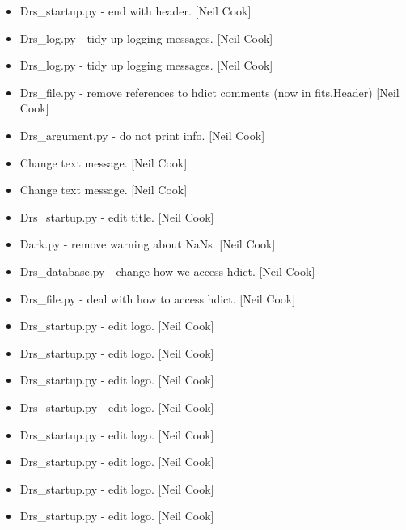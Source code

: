 \documentclass[a4paper,10pt,english]{report}
\begin{document}
\begin{itemize}
\item {} 
Drs\_startup.py - end with header. {[}Neil Cook{]}

\item {} 
Drs\_log.py - tidy up logging messages. {[}Neil Cook{]}

\item {} 
Drs\_log.py - tidy up logging messages. {[}Neil Cook{]}

\item {} 
Drs\_file.py - remove references to hdict comments (now in fits.Header)
{[}Neil Cook{]}

\item {} 
Drs\_argument.py - do not print info. {[}Neil Cook{]}

\item {} 
Change text message. {[}Neil Cook{]}

\item {} 
Change text message. {[}Neil Cook{]}

\item {} 
Drs\_startup.py - edit title. {[}Neil Cook{]}

\item {} 
Dark.py - remove warning about NaNs. {[}Neil Cook{]}

\item {} 
Drs\_database.py - change how we access hdict. {[}Neil Cook{]}

\item {} 
Drs\_file.py - deal with how to access hdict. {[}Neil Cook{]}

\item {} 
Drs\_startup.py - edit logo. {[}Neil Cook{]}

\item {} 
Drs\_startup.py - edit logo. {[}Neil Cook{]}

\item {} 
Drs\_startup.py - edit logo. {[}Neil Cook{]}

\item {} 
Drs\_startup.py - edit logo. {[}Neil Cook{]}

\item {} 
Drs\_startup.py - edit logo. {[}Neil Cook{]}

\item {} 
Drs\_startup.py - edit logo. {[}Neil Cook{]}

\item {} 
Drs\_startup.py - edit logo. {[}Neil Cook{]}

\item {} 
Drs\_startup.py - edit logo. {[}Neil Cook{]}


\end{itemize}
\end{document}
